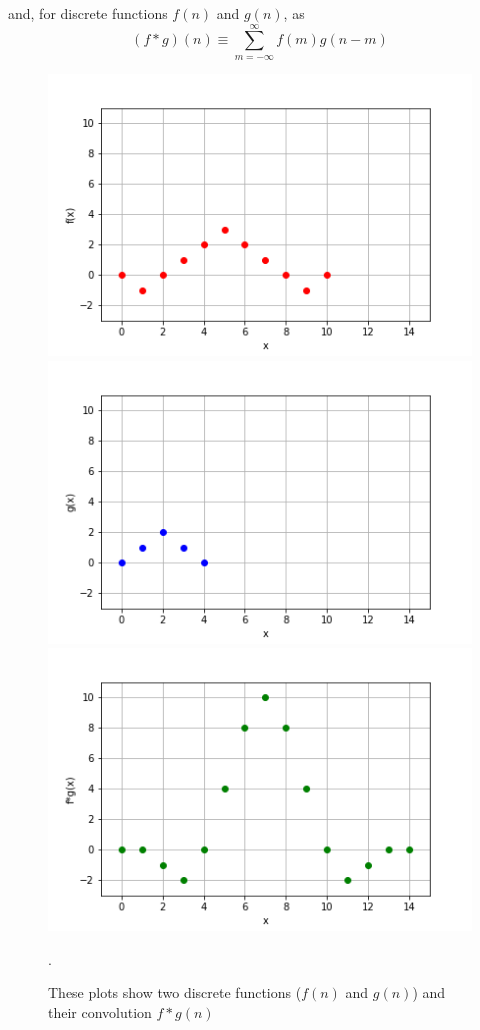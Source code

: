 and, for discrete functions $f(n)$ and $g(n)$, as
\begin{equation}
(f * g)(n)\equiv\sum_{m=-\infty}^{\infty}f(m) g(n-m)
\end{equation}
\begin{figure}[h]
    \includegraphics[width=.32\linewidth]{graphics/convolution/convolution_discrete_f_gebs.png}
    \includegraphics[width=.32\linewidth]{graphics/convolution/convolution_discrete_g_gebs.png}
    \includegraphics[width=.32\linewidth]{graphics/convolution/convolution_discrete_fg_gebs.png}
    \caption{These plots show two discrete functions ($f(n)$ and $g(n)$) and their convolution $f*g(n)$}.
    \label{fig:discreteconvolution}
\end{figure}\FloatBarrier
